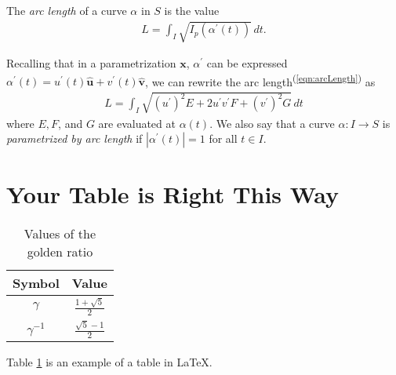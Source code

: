 \documentclass[letter]{article}
\newcommand{\X}{\mathbf{x}}
\newcommand{\BV}[1]{\hat{\mathbf{#1}}}
\begin{document}
The \textit{arc length} of a curve $\alpha$ in $S$ is the value
\begin{align}\label{eqn:arcLength}
L = \int_I \sqrt{I_p (\alpha^\prime (t))} \, dt.
\end{align}

    Recalling that in a parametrization $\X$, $\alpha^\prime$ can be expressed $\alpha^\prime (t) = u^\prime(t) \BV{u} + v^\prime(t) \BV{v}$, we can rewrite the arc length\textsuperscript{(\ref{eqn:arcLength})} as
\begin{align}
L = \int_I \sqrt{(u^\prime)^2 E + 2 u^\prime v^\prime F + (v^\prime)^2 G} \, dt
\end{align}
where $E, F$, and $G$ are evaluated at $\alpha(t)$. We also say that a curve $\alpha: I \to S$ is \textit{parametrized by arc length} if $|\alpha^\prime (t)| = 1$ for all $t \in I$. \lipsum[2]


\section{Your Table is Right This Way}

\begin{table}[h] 
\centering

\begin{tabular}{ | c c | }
\hline
Symbol & Value \\ [.25em]
\hline \hline
$\gamma$ & $\frac{1 + \sqrt{5}}{2}$ \\ [.25em]
$\gamma^{-1} $ & $\frac{\sqrt{5} - 1}{2}$ \\[.25em]
\hline 
\end{tabular}
\caption{Values of the golden ratio}
\label{tab:gamma}
\end{table}

Table \ref{tab:gamma} is an example of a table in \LaTeX. \lipsum[3]
\end{document}
